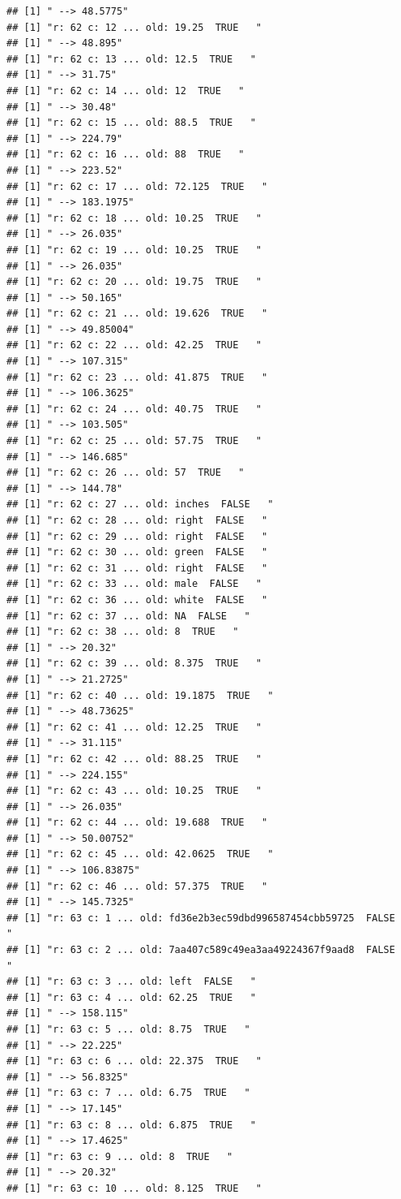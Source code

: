 \documentclass[]{article}
\begin{document}
\begin{verbatim}
## [1] " --> 48.5775"
## [1] "r: 62 c: 12 ... old: 19.25  TRUE   "
## [1] " --> 48.895"
## [1] "r: 62 c: 13 ... old: 12.5  TRUE   "
## [1] " --> 31.75"
## [1] "r: 62 c: 14 ... old: 12  TRUE   "
## [1] " --> 30.48"
## [1] "r: 62 c: 15 ... old: 88.5  TRUE   "
## [1] " --> 224.79"
## [1] "r: 62 c: 16 ... old: 88  TRUE   "
## [1] " --> 223.52"
## [1] "r: 62 c: 17 ... old: 72.125  TRUE   "
## [1] " --> 183.1975"
## [1] "r: 62 c: 18 ... old: 10.25  TRUE   "
## [1] " --> 26.035"
## [1] "r: 62 c: 19 ... old: 10.25  TRUE   "
## [1] " --> 26.035"
## [1] "r: 62 c: 20 ... old: 19.75  TRUE   "
## [1] " --> 50.165"
## [1] "r: 62 c: 21 ... old: 19.626  TRUE   "
## [1] " --> 49.85004"
## [1] "r: 62 c: 22 ... old: 42.25  TRUE   "
## [1] " --> 107.315"
## [1] "r: 62 c: 23 ... old: 41.875  TRUE   "
## [1] " --> 106.3625"
## [1] "r: 62 c: 24 ... old: 40.75  TRUE   "
## [1] " --> 103.505"
## [1] "r: 62 c: 25 ... old: 57.75  TRUE   "
## [1] " --> 146.685"
## [1] "r: 62 c: 26 ... old: 57  TRUE   "
## [1] " --> 144.78"
## [1] "r: 62 c: 27 ... old: inches  FALSE   "
## [1] "r: 62 c: 28 ... old: right  FALSE   "
## [1] "r: 62 c: 29 ... old: right  FALSE   "
## [1] "r: 62 c: 30 ... old: green  FALSE   "
## [1] "r: 62 c: 31 ... old: right  FALSE   "
## [1] "r: 62 c: 33 ... old: male  FALSE   "
## [1] "r: 62 c: 36 ... old: white  FALSE   "
## [1] "r: 62 c: 37 ... old: NA  FALSE   "
## [1] "r: 62 c: 38 ... old: 8  TRUE   "
## [1] " --> 20.32"
## [1] "r: 62 c: 39 ... old: 8.375  TRUE   "
## [1] " --> 21.2725"
## [1] "r: 62 c: 40 ... old: 19.1875  TRUE   "
## [1] " --> 48.73625"
## [1] "r: 62 c: 41 ... old: 12.25  TRUE   "
## [1] " --> 31.115"
## [1] "r: 62 c: 42 ... old: 88.25  TRUE   "
## [1] " --> 224.155"
## [1] "r: 62 c: 43 ... old: 10.25  TRUE   "
## [1] " --> 26.035"
## [1] "r: 62 c: 44 ... old: 19.688  TRUE   "
## [1] " --> 50.00752"
## [1] "r: 62 c: 45 ... old: 42.0625  TRUE   "
## [1] " --> 106.83875"
## [1] "r: 62 c: 46 ... old: 57.375  TRUE   "
## [1] " --> 145.7325"
## [1] "r: 63 c: 1 ... old: fd36e2b3ec59dbd996587454cbb59725  FALSE   "
## [1] "r: 63 c: 2 ... old: 7aa407c589c49ea3aa49224367f9aad8  FALSE   "
## [1] "r: 63 c: 3 ... old: left  FALSE   "
## [1] "r: 63 c: 4 ... old: 62.25  TRUE   "
## [1] " --> 158.115"
## [1] "r: 63 c: 5 ... old: 8.75  TRUE   "
## [1] " --> 22.225"
## [1] "r: 63 c: 6 ... old: 22.375  TRUE   "
## [1] " --> 56.8325"
## [1] "r: 63 c: 7 ... old: 6.75  TRUE   "
## [1] " --> 17.145"
## [1] "r: 63 c: 8 ... old: 6.875  TRUE   "
## [1] " --> 17.4625"
## [1] "r: 63 c: 9 ... old: 8  TRUE   "
## [1] " --> 20.32"
## [1] "r: 63 c: 10 ... old: 8.125  TRUE   "

\end{verbatim}
\end{document}
